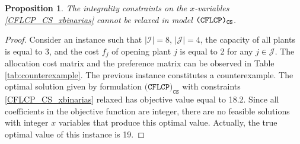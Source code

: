 \documentclass[preprint,11pt,authoryear]{elsarticle}
\newcommand\red[1]{{\color{red}#1}}
\def\J{\mathcal{J}}
\def\I{\mathcal{I}}
\newtheorem{prop}[theorem]{Proposition}
\begin{document}
\begin{prop}
    The integrality constraints on the $x$-variables \eqref{CFLCP_CS_xbinarias} cannot be relaxed in model ${\normalfont\texttt{(CFLCP)}_{\texttt{CS}}}$.
\end{prop}
\begin{proof}
Consider an instance such that $|\I|=8$, $|\J|=4$, the capacity of all plants is equal to 3, and the cost $f_j$ of opening plant $j$ is equal to 2 for any $j\in \J$. The allocation cost matrix and the preference matrix can be observed in Table \ref{tab:counterexample}. The previous instance constitutes a counterexample. The optimal solution given by formulation $\texttt{(CFLCP)}_{\texttt{CS}}$ with constraints \eqref{CFLCP_CS_xbinarias} relaxed has objective value equal to 18.2. Since all coefficients in the objective function are integer, there are no feasible solutions with integer $x$ variables that produce this optimal value. Actually, the true optimal value of this instance is 19. 
\end{proof}



\end{document}
